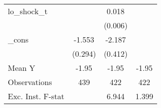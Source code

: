 {\begin{tabular}{l*{3}{c}}
\addlinespace
lo\_shock\_t  &                     &       0.018\sym{***}&                     \\
            &                     &     (0.006)         &                     \\
\addlinespace
\_cons      &      -1.553\sym{***}&      -2.187\sym{***}&                     \\
            &     (0.294)         &     (0.412)         &                     \\
\midrule
Mean Y      &       -1.95         &       -1.95         &       -1.95         \\
Observations&         439         &         422         &         422         \\
Exc. Inst. F-stat&                     &       6.944         &       1.399         \\
\bottomrule
\end{tabular}
}
